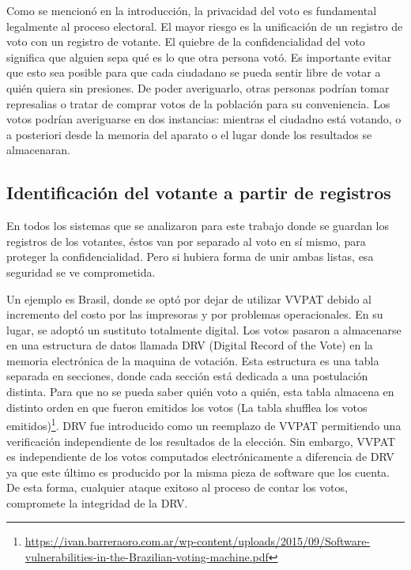 Como se mencionó en la introducción, la privacidad del voto es fundamental legalmente al proceso electoral. El mayor riesgo es la unificación de un registro de voto con un registro de votante.
El quiebre de la confidencialidad del voto significa que alguien sepa qué es lo que otra persona votó. Es importante evitar que esto sea posible para que cada ciudadano se pueda sentir libre de votar a quién quiera sin presiones. De poder averiguarlo, otras personas podrían tomar represalias o tratar de comprar votos de la población para su conveniencia. Los votos podrían averiguarse en dos instancias: mientras el ciudadno está votando, o a posteriori desde la memoria del aparato o el lugar donde los resultados se almacenaran.

\subsection{Identificación del votante a partir de registros}

En todos los sistemas que se analizaron para este trabajo donde se guardan los registros de los votantes, éstos van por separado al voto en sí mismo, para proteger la confidencialidad. Pero si hubiera forma de unir ambas listas, esa seguridad se ve comprometida.

Un ejemplo es Brasil, donde se optó por dejar de utilizar VVPAT debido al incremento del costo por las impresoras y por problemas operacionales. En su lugar, se adoptó un sustituto totalmente digital. Los votos pasaron a almacenarse en una estructura de datos llamada DRV (Digital Record of the Vote) en la memoria electrónica de la maquina de votación. Esta estructura es una tabla separada en secciones, donde cada sección está dedicada a una postulación distinta. Para que no se pueda saber quién voto a quién, esta tabla almacena en distinto orden en que fueron emitidos los votos (La tabla shufflea los votos emitidos)\footnote{\url{https://ivan.barreraoro.com.ar/wp-content/uploads/2015/09/Software-vulnerabilities-in-the-Brazilian-voting-machine.pdf}}.
DRV fue introducido como un reemplazo de VVPAT permitiendo una verificación independiente de los resultados de la elección. Sin embargo, VVPAT es independiente de los votos computados electrónicamente a diferencia de DRV ya que este último es producido por la misma pieza de software que los cuenta. De esta forma, cualquier ataque exitoso al proceso de contar los votos, compromete la integridad de la DRV.

